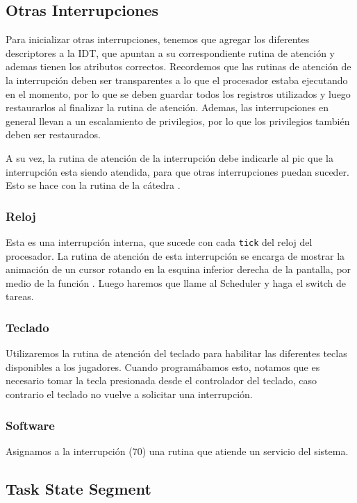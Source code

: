 \subsection{Otras Interrupciones}

Para inicializar otras interrupciones, tenemos que agregar los diferentes descriptores a la IDT, que apuntan a su correspondiente rutina de atención y ademas tienen los atributos correctos. Recordemos que las rutinas de atención de la interrupción deben ser transparentes a lo que el procesador estaba ejecutando en el momento, por lo que se deben guardar todos los registros utilizados y luego restaurarlos al finalizar la rutina de atención. Ademas, las interrupciones en general llevan a un escalamiento de privilegios, por lo que los privilegios también deben ser restaurados.

A su vez, la rutina de atención de la interrupción debe indicarle al pic que la interrupción esta siendo atendida, para que otras interrupciones puedan suceder. Esto se hace con la rutina de la cátedra .

\subsubsection{Reloj}

Esta es una interrupción interna, que sucede con cada \texttt{tick} del reloj del procesador. La rutina de atención de esta interrupción se encarga de mostrar la animación de un cursor rotando en la esquina inferior derecha de la pantalla, por medio de la función . Luego haremos que llame al Scheduler y haga el switch de tareas.

\subsubsection{Teclado}
Utilizaremos la rutina de atención del teclado para habilitar las diferentes teclas disponibles a los jugadores. Cuando programábamos esto, notamos que es necesario tomar la tecla presionada desde el controlador del teclado, caso contrario el teclado no vuelve a solicitar una interrupción.

\subsubsection{Software}
Asignamos a la interrupción  (70) una rutina que atiende un servicio del sistema.

\subsection{Task State Segment}

